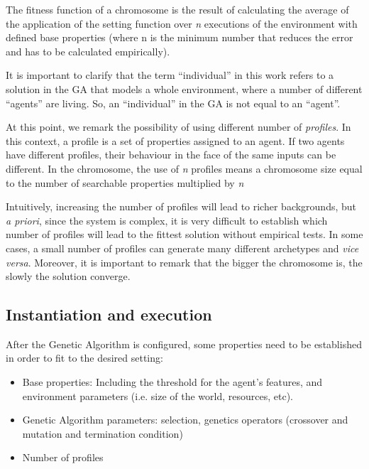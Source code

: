 \documentclass[letterpaper]{article}
\begin{document}
The fitness function of a chromosome is the result of calculating the average of the application of the setting function over \textit{n} executions of the environment with defined base properties (where n is the minimum number that reduces the error and has to be calculated empirically).

It is important to clarify that the term ``individual'' in this work refers to a solution in the GA that models a whole environment, where a number of different ``agents'' are living. So, an ``individual'' in the GA is not equal to an ``agent''.  %


At this point, we remark the possibility of using different number of {\em profiles}. In this context, a profile is a set of properties assigned to an agent. If two agents have different profiles, their behaviour in the face of the same inputs can be different. In the chromosome, the use of \textit{n} profiles means a chromosome size equal to the number of searchable properties multiplied by \textit{n} 

Intuitively, increasing the number of profiles will lead to richer backgrounds, but \textit{a priori}, since the system is complex, it is very difficult to establish which number of profiles will lead to the fittest solution without empirical tests. In some cases, a small number of profiles can generate many different archetypes and \textit{vice versa}. Moreover, it is important to remark that the bigger the chromosome is, the slowly the solution converge.


\subsection{Instantiation and execution}

After the Genetic Algorithm is configured, some properties need to be established in order to fit to the desired setting:
\begin{itemize}
\item Base properties: Including the threshold for the agent's features, and environment parameters (i.e. size of the world, resources, etc).
\item Genetic Algorithm parameters: selection, genetics operators (crossover and mutation and termination condition)
\item Number of profiles
\end{itemize}
\end{document}

